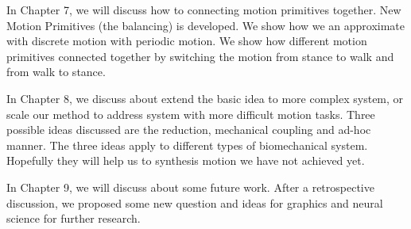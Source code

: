 In Chapter 7, we will discuss how to connecting motion primitives together.
New Motion Primitives (the balancing) is developed. We show how we an approximate with discrete motion with periodic motion. We show how different motion primitives connected together by switching the motion from stance to walk and from walk to stance.

In Chapter 8, we discuss about extend the basic idea to more complex system, or scale our method to address system with more difficult motion tasks. Three possible ideas discussed are the reduction, mechanical coupling and ad-hoc manner. The three ideas apply to different types of biomechanical system.
Hopefully they will help us to synthesis motion we have not achieved yet.

In Chapter 9, we will discuss about some future work. After a retrospective discussion, we proposed some new question and ideas for graphics and neural science for further research.







